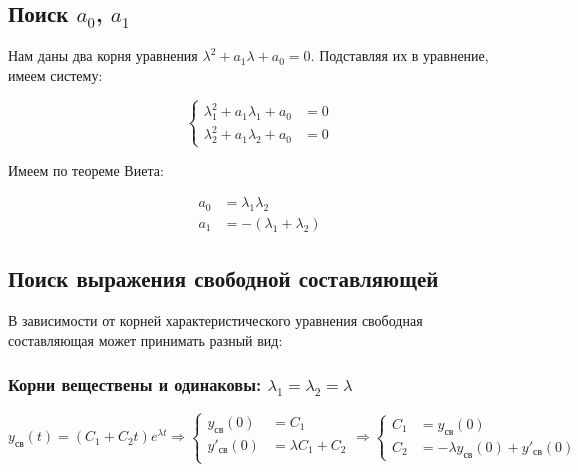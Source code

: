 \documentclass[12pt, a4paper] {ncc}
\begin{document}
\subsection{Поиск $a_0$, $a_1$}

Нам даны два корня уравнения $\lambda^2 + a_1 \lambda + a_0 = 0$. Подставляя их
в уравнение, имеем систему:

\begin{equation*}
    \left\{
        \begin{aligned}
            \lambda_1^2 + a_1 \lambda_1 + a_0 &= 0 \\
            \lambda_2^2 + a_1 \lambda_2 + a_0 &= 0
        \end{aligned}
    \right.
\end{equation*}

Имеем по теореме Виета:

\begin{equation*}
    \begin{aligned}
        a_0 &= \lambda_1 \lambda_2 \\
        a_1 &= - \left(\lambda_1 + \lambda_2\right)
    \end{aligned}
\end{equation*}

\subsection{Поиск выражения свободной составляющей}

В зависимости от корней характеристического уравнения свободная составляющая
может принимать разный вид:

\subsubsection{Корни веществены и одинаковы: $\lambda_1 = \lambda_2 = \lambda$}

    \begin{equation*}
        y_\text{св} (t) = \left(C_1 + C_2 t\right) e^{\lambda t}
        \Rightarrow
            \left\{\begin{aligned}
            y_\text{св}  (0) &= C_1 \\
            y'_\text{св} (0) &= \lambda C_1 + C_2 \\
            \end{aligned}\right.
        \Rightarrow
            \left\{\begin{aligned}
            C_1 &= y_\text{св}(0) \\
            C_2 &= - \lambda y_\text{св}(0) + y'_\text{св}(0)
            \end{aligned}\right.
    \end{equation*}
\end{document}
